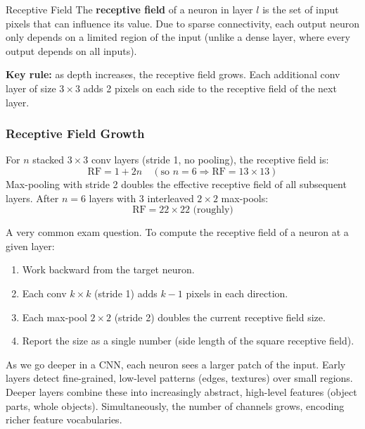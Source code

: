 \documentclass[11pt,a4paper]{article}
\newcommand{\term}[1]{\textcolor{DefGreen}{\textbf{#1}}}
\begin{document}
\begin{defbox}{Receptive Field}
The \term{receptive field} of a neuron in layer $l$ is the set of input pixels that can influence its value. Due to sparse connectivity, each output neuron only depends on a limited region of the input (unlike a dense layer, where every output depends on all inputs).

\textbf{Key rule:} as depth increases, the receptive field grows. Each additional conv layer of size $3\times3$ adds 2 pixels on each side to the receptive field of the next layer.
\end{defbox}

\subsubsection{Receptive Field Growth}

For $n$ stacked $3\times3$ conv layers (stride 1, no pooling), the receptive field is:
\[
\text{RF} = 1 + 2n \quad (\text{so }n=6 \Rightarrow \text{RF} = 13\times13)
\]
Max-pooling with stride 2 doubles the effective receptive field of all subsequent layers. After $n=6$ layers with 3 interleaved $2\times2$ max-pools:
\[
\text{RF} = 22\times22 \text{ (roughly)}
\]

\begin{warnbox}
A very common exam question. To compute the receptive field of a neuron at a given layer:
\begin{enumerate}
  \item Work backward from the target neuron.
  \item Each conv $k\times k$ (stride 1) adds $k-1$ pixels in each direction.
  \item Each max-pool $2\times2$ (stride 2) doubles the current receptive field size.
  \item Report the size as a single number (side length of the square receptive field).
\end{enumerate}
\end{warnbox}

\begin{insightbox}[Deeper = wider receptive field = higher-level features]
As we go deeper in a CNN, each neuron sees a larger patch of the input. Early layers detect fine-grained, low-level patterns (edges, textures) over small regions. Deeper layers combine these into increasingly abstract, high-level features (object parts, whole objects). Simultaneously, the number of channels grows, encoding richer feature vocabularies.
\end{insightbox}
\end{document}
